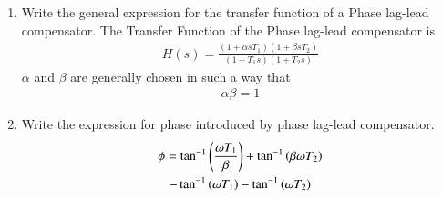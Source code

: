 \begin{enumerate}[label=\thesection.\arabic*.,ref=\thesection.\theenumi]

\item
Write the general expression for the transfer function of a Phase lag-lead compensator. 
\solution
The Transfer Function of the Phase lag-lead compensator is
\begin{align}
\label{eq:ee18btech11044_hs_gen}
    H(s) = \frac{(1+ \alpha s T_1)(1+ \beta s T_2)}{(1+T_1 s)(1 + T_2 s)}
\end{align}
$\alpha$ and $\beta$ are generally chosen in such a way that
\begin{align}
    \alpha \beta = 1
\end{align}
%
\item Write the expression for phase introduced by phase lag-lead compensator. 
\solution 
\begin{multline}
    \phi = \tan^{-1}\left(\frac{\omega T_1}{\beta}\right) + \tan^{-1}\left( \beta \omega T_2\right) 
\\
- \tan^{-1}\left(\omega T_1\right) - \tan^{-1}\left(\omega T_2\right)
\end{multline}


\end{enumerate}
